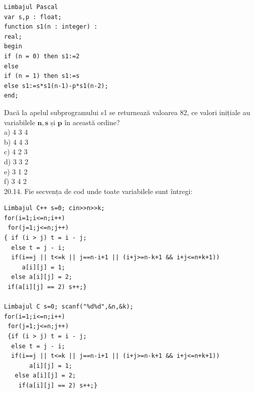 {{\begin{verbatim}
Limbajul Pascal
var s,p : float;
function s1(n : integer) :
real;
begin
if (n = 0) then s1:=2
else
if (n = 1) then s1:=s
else s1:=s*s1(n-1)-p*s1(n-2);
end;
\end{verbatim}
Dacă la apelul subprogramului s1 se returnează valoarea 82, ce valori inițiale au variabilele $\mathbf{n}, \mathbf{s}$ și $\mathbf{p}$ în această ordine?
\\
a) 4 3 4
\\
b) 4 4 3
\\
c) 4 2 3
\\
d) 3 3 2
\\
e) 3 1 2
\\
f) 3 4 2
\\
20.14. Fie secvența de cod unde toate variabilele sunt întregi:
\begin{verbatim}
Limbajul C++ s=0; cin>>n>>k; 
for(i=1;i<=n;i++) 
 for(j=1;j<=n;j++)  
{ if (i > j) t = i - j; 
  else t = j - i; 
  if(i==j || t<=k || j==n-i+1 || (i+j>=n-k+1 && i+j<=n+k+1)) 
     a[i][j] = 1; 
  else a[i][j] = 2; 
 if(a[i][j] == 2) s++;} 
 
Limbajul C s=0; scanf("%d%d",&n,&k); 
for(i=1;i<=n;i++) 
 for(j=1;j<=n;j++) 
 {if (i > j) t = i - j; 
  else t = j - i; 
  if(i==j || t<=k || j==n-i+1 || (i+j>=n-k+1 && i+j<=n+k+1)) 
       a[i][j] = 1; 
   else a[i][j] = 2; 
    if(a[i][j] == 2) s++;} 
 

\end{verbatim}}}
